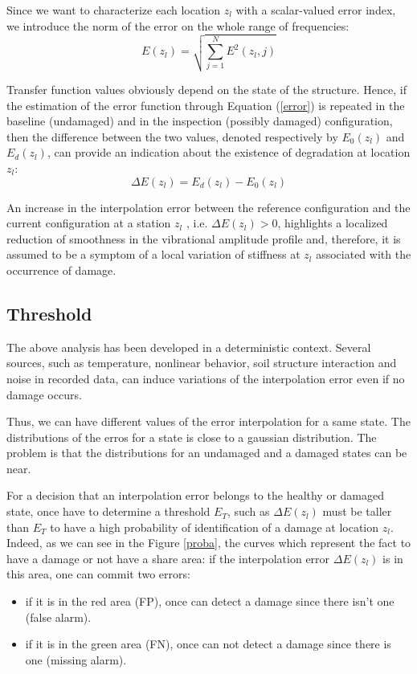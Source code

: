 \documentclass[journal]{IEEEtran}
\begin{document}
Since we want to characterize each location $z_l$ with a scalar-valued error index, we introduce the norm of the error on the whole range of
frequencies:
\begin{equation}
E(z_l) = \sqrt{  \sum\limits_{j=1}^N  E^2(z_l,j) }
\label{error}
\end{equation}


Transfer function values obviously depend on the state of the structure. Hence, if the estimation of the error function
through Equation (\ref{error}) is repeated in the baseline (undamaged) and in the inspection (possibly damaged) configuration, then the
difference between the two values, denoted respectively by $E_0(z_l)$ and $E_d(z_l)$, can provide an indication about the existence of
degradation at location $z_l$:
\begin{equation}
\Delta E(z_l) = E_d(z_l) - E_0(z_l)
\end{equation}

An increase in the interpolation error between the reference configuration and the current configuration at a station $z_l$ , i.e.
$ \Delta E(z_l) > 0$, highlights a localized reduction of smoothness in the vibrational amplitude profile and, therefore, it is assumed
to be a symptom of a local variation of stiffness at $z_l$ associated with the occurrence of damage.


\subsection{Threshold}

The above analysis has been developed in a deterministic context. Several sources, such as temperature, nonlinear
behavior, soil structure interaction and noise in recorded data, can induce variations of the interpolation error even if no
damage occurs.

Thus, we can have different values of the error interpolation for a same state. The distributions of the erros for a state is close to a gaussian distribution. The problem is that the distributions for an undamaged and a damaged states can be near.

For a decision that an interpolation error belongs to the healthy or damaged state, once have to determine a threshold $E_T$, such as $ \Delta E(z_l)$ must be taller than $E_T$ to have a high probability of identification of a damage at location $z_l$. Indeed, as we can see in the Figure \ref{proba}, the curves which represent the fact to have a damage or not have a share area: if the interpolation error $ \Delta E(z_l)$ is in this area, one can commit two errors:
\begin{itemize}
\item if it is in the red area (FP), once can detect a damage since there isn't one (false alarm).
\item if it is in the green area (FN), once can not detect a damage since there is one (missing alarm).
\end{itemize}
\end{document}
